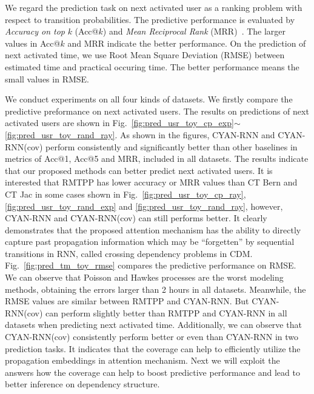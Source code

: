 We regard the prediction task on next activated user as a ranking problem
with respect to transition probabilities. The predictive performance is
evaluated by \textit{Accuracy on top} $k$ (Acc@$k$) and \textit{Mean Reciprocal Rank}
(MRR)~\cite{voorhees1999trec}.
The larger values in Acc@$k$ and MRR indicate the better performance.
On the prediction of next activated time, we use Root Mean Square Deviation
(RMSE) between estimated time and practical occuring time. The better
performance means the small values in RMSE.   

We conduct experiments on all four
kinds of datasets. 
We firstly compare the predictive preformance on
next activated users. The results on predictions of next
activated users are shown in Fig.~\ref{fig:pred_usr_toy_cp_exp}$\sim$
\ref{fig:pred_usr_toy_rand_ray}. As shown in the figures, CYAN-RNN and CYAN-RNN(cov)
perform consistently and significantly better than other baselines in metrics of
Acc@1, Acc@5 and MRR, included in all datasets. 
The results indicate that our proposed methods can better predict next activated
users. It is interested that RMTPP has lower accuracy or MRR values than CT Bern
and CT Jac in some cases shown in
Fig.~\ref{fig:pred_usr_toy_cp_ray},
\ref{fig:pred_usr_toy_rand_exp} and \ref{fig:pred_usr_toy_rand_ray}, however,
CYAN-RNN and CYAN-RNN(cov) can still performs better. It clearly demonstrates
that the proposed attention mechanism has the ability to directly capture past
propagation information which may be ``forgetten'' by sequential transitions in
RNN, called crossing dependency problems in CDM.
Fig.~\ref{fig:pred_tm_toy_rmse} compares the predictive performance on RMSE.
We can observe that Poisson and Hawkes processes are the worst modeling methods,
obtaining the errors larger than 2 hours in all datasets. Meanwhile, the
RMSE values are similar between RMTPP and CYAN-RNN. But 
CYAN-RNN(cov) can perform slightly better than RMTPP and CYAN-RNN in all
datasets when predicting next activated time. 
Additionally, we can observe that CYAN-RNN(cov) consistently perform better or
even than CYAN-RNN in two prediction tasks. It indicates that the coverage can
help to efficiently utilize the propagation embeddings in attention mechanism.
Next we will exploit the answers how the coverage can help to boost predictive
performance and lead to better inference on dependency structure.

